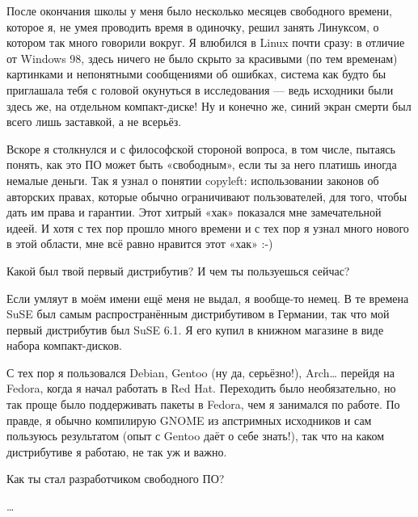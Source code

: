 \documentclass[10pt, a5paper]{article}
\begin{document}
\begin{Parallel}[p]{}{}
{\a После окончания школы у меня было несколько месяцев свободного времени, которое я, не умея проводить время в одиночку, решил занять Линуксом, о котором так много говорили вокруг. Я влюбился в Linux почти сразу: в отличие от Windows 98, здесь ничего не было скрыто за красивыми (по тем временам) картинками и непонятными сообщениями об ошибках, система как будто бы приглашала тебя с головой окунуться в исследования — ведь исходники были здесь же, на отдельном компакт-диске! Ну и конечно же, синий экран смерти был всего лишь заставкой\fakefootnote{}, а не всерьёз.

Вскоре я столкнулся и с философской стороной вопроса, в том числе, пытаясь понять, как это ПО может быть «свободным», если ты за него платишь иногда немалые деньги. Так я узнал о понятии copyleft: использовании законов об авторских правах, которые обычно ограничивают пользователей, для того, чтобы дать им права и гарантии. Этот хитрый «хак» показался мне замечательной идеей. И хотя с тех пор прошло много времени и с тех пор я узнал много нового в этой области, мне всё равно нравится этот «хак» :-)

\q Какой был твой первый дистрибутив? И чем ты пользуешься сейчас?

\a Если умляут в моём имени ещё меня не выдал, я вообще-то немец. В те времена SuSE был самым распространённым дистрибутивом в Германии, так что мой первый дистрибутив был SuSE 6.1\fakefootnote{}. Я его купил в книжном магазине в виде набора компакт-дисков.

С тех пор я пользовался Debian, Gentoo (ну да, серьёзно!), Arch… перейдя на Fedora, когда я начал работать в Red Hat. Переходить было необязательно, но так проще было поддерживать пакеты в Fedora, чем я занимался по работе. По правде, я обычно компилирую GNOME из апстримных исходников и сам пользуюсь результатом (опыт с Gentoo даёт о себе знать!)\fakefootnote{}, так что на каком дистрибутиве я работаю, не так уж и важно.

\q Как ты стал разработчиком свободного ПО?

…

     }
   \end{Parallel}









 
\end{document}
